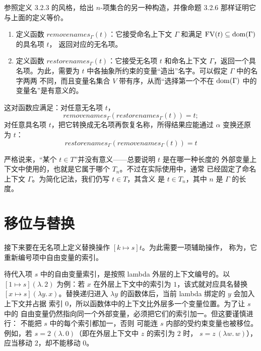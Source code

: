 \begin{exercise}[\(\star\star\star,\nrightarrow\)]
\label{ex:6.1.4}
参照定义 3.2.3 的风格，给出 \(n\)-项集合的另一种构造，并像命题 3.2.6
那样证明它与上面的定义等价。
\end{exercise}

\begin{exercise}
\label{ex:6.1.5}
\begin{enumerate}
  \item 定义函数 \(\mathit{removenames}_{\Gamma}(t)\)：它接受命名上下文
    \(\Gamma\) 和满足 \(\operatorname{FV}(t)\subseteq\operatorname{dom}(\Gamma)\) 的具名项 \(t\)，
    返回对应的无名项。
  \item 定义函数 \(\mathit{restorenames}_{\Gamma}(t)\)：它接受无名项
    \(t\) 和命名上下文 \(\Gamma\)，返回一个具名项。为此，需要为 \(t\)
    中各抽象所约束的变量“造出”名字。可以假定 \(\Gamma\) 中的名字两两
    不同，而且变量名集合 \(V\) 带有序，从而“选择第一个不在
    \(\operatorname{dom}(\Gamma)\) 中的变量名”是有意义的。
\end{enumerate}
这对函数应满足：对任意无名项 \(t\)，
\[
 \mathit{removenames}_{\Gamma}
   (\mathit{restorenames}_{\Gamma}(t))=t;
\]
对任意具名项 \(t\)，把它转换成无名项再恢复名称，所得结果应能通过
\(\alpha\) 变换还原为 \(t\)：
\[
 \mathit{restorenames}_{\Gamma}
   (\mathit{removenames}_{\Gamma}(t))=t
\]
\end{exercise}

严格说来，“某个 \(t\in T\)”并没有意义——总要说明 \(t\) 是在哪一种长度的
外部变量上下文中使用的，也就是它属于哪个 \(T_n\)。不过在实际使用中，通常
已经固定了命名上下文 \(\Gamma\)。为简化记法，我们仍写 \(t\in T\)，其含义
是 \(t\in T_n\)，其中 \(n\) 是 \(\Gamma\) 的长度。

\section{移位与替换}
\label{sec:6.2}

接下来要在无名项上定义替换操作 \([k\mapsto s]t\)。为此需要一项辅助操作，
称为，它重新编号项中自由变量的索引。

待代入项 \(s\) 中的自由变量索引，是按照 lambda 外层的上下文编号的。以
\([1\mapsto s](\lambda.\,2)\) 为例：若 \(x\) 在外层上下文中的索引为
\(1\)，该式就对应具名替换 \([x\mapsto s](\lambda y.\,x)\)。替换递归进入
\(\lambda y\) 的函数体后，当前 lambda 绑定的 \(y\) 会加入上下文并占据
索引 \(0\)，所以函数体中的上下文比外层多一个变量位置。为了让 \(s\) 中的
自由变量仍然指向同一个外部变量，必须把它们的索引加一。但这要谨慎进行：
不能把 \(s\) 中的每个索引都加一，否则
可能连 \(s\) 内部的受约束变量也被移位。例如，若
\(s=2\,(\lambda.\,0)\)（即在外层上下文中 \(z\) 的索引为 \(2\) 时，
\(s=z\,(\lambda w.\,w)\)），应当移动 \(2\)，却不能移动 \(0\)。

